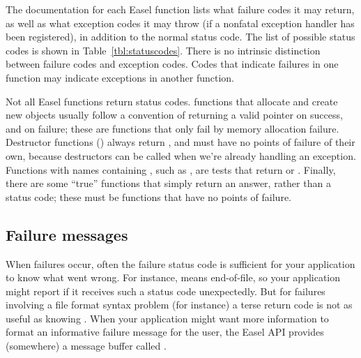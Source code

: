 The documentation for each Easel function lists what failure codes it
may return, as well as what exception codes it may throw (if a
nonfatal exception handler has been registered), in addition to the
 normal status code. The list of possible status codes is
shown in Table~\ref{tbl:statuscodes}. There is no intrinsic
distinction between failure codes and exception codes. Codes that
indicate failures in one function may indicate exceptions in another
function.

\begin{table}
\begin{center}

\end{center}
\caption{List of all status codes that might be returned by Easel functions.}
\label{tbl:statuscodes}
\end{table}

Not all Easel functions return status codes. 
functions that allocate and create new objects usually follow a
convention of returning a valid pointer on success, and 
on failure; these are functions that only fail by memory allocation
failure. Destructor functions () always return
, and must have no points of failure of their own, because
destructors can be called when we're already handling an
exception. Functions with names containing , such as
, are tests that return  or
. Finally, there are some ``true'' functions that simply
return an answer, rather than a status code; these must be functions
that have no points of failure.

\subsection{Failure messages} 

When failures occur, often the failure status code is sufficient for
your application to know what went wrong. For instance, 
means end-of-file, so your application might report  if it receives such a status code unexpectedly. But for
failures involving a file format syntax problem (for instance) a terse
 return code is not as useful as knowing
. When your application might want
more information to format an informative failure message for the
user, the Easel API provides (somewhere) a message buffer called
.

